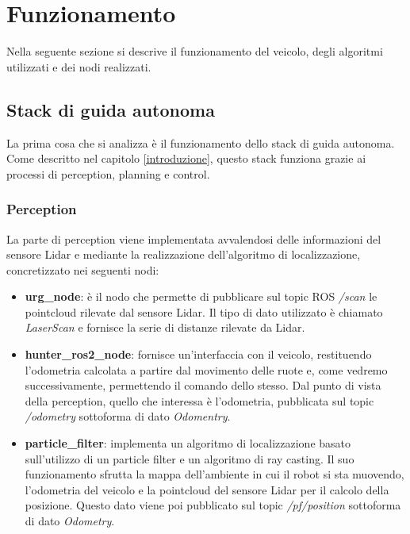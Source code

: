 \chapter{Funzionamento}
Nella seguente sezione si descrive il funzionamento del veicolo, degli algoritmi utilizzati e dei nodi realizzati.

\section{Stack di guida autonoma}
La prima cosa che si analizza è il funzionamento dello stack di guida autonoma. Come descritto nel capitolo \ref{introduzione}, questo stack funziona grazie ai processi di perception, planning e control. 

\subsection{Perception} \label{funzionamento_autonomo_perception}
La parte di perception viene implementata avvalendosi delle informazioni del sensore Lidar e mediante la realizzazione dell'algoritmo di localizzazione, concretizzato nei seguenti nodi:
\begin{itemize}
  \item \textbf{urg\_node}: è il nodo che permette di pubblicare sul topic ROS \textit{/scan} le pointcloud rilevate dal sensore Lidar. Il tipo di dato utilizzato è chiamato \textit{LaserScan} e fornisce la serie di distanze rilevate da Lidar.
  
  \item \textbf{hunter\_ros2\_node}: fornisce un'interfaccia con il veicolo, restituendo l'odometria calcolata a partire dal movimento delle ruote e, come vedremo successivamente, permettendo il comando dello stesso. Dal punto di vista della perception, quello che interessa è l'odometria, pubblicata sul topic \textit{/odometry} sottoforma di dato \textit{Odomentry}. 
  
  \item \textbf{particle\_filter}: implementa un algoritmo di localizzazione basato sull'utilizzo di un particle filter e un algoritmo di ray casting. Il suo funzionamento sfrutta la mappa dell'ambiente in cui il robot si sta muovendo, l'odometria del veicolo e la pointcloud del sensore Lidar per il calcolo della posizione. Questo dato viene poi pubblicato sul topic \textit{/pf/position} sottoforma di dato \textit{Odometry}.
\end{itemize}


